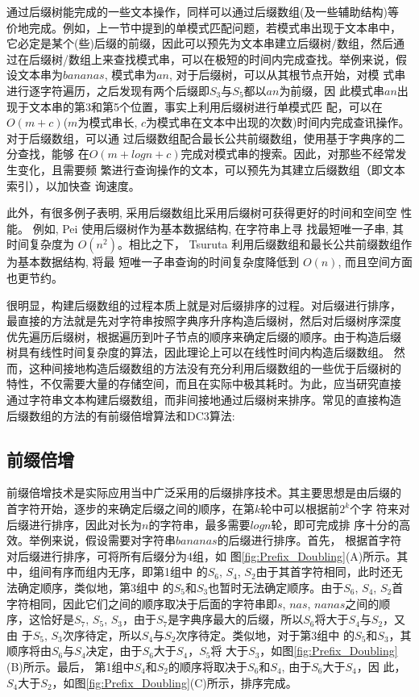 通过后缀树能完成的一些文本操作，同样可以通过后缀数组(及一些辅助结构)等
价地完成。例如，上一节中提到的单模式匹配问题，若模式串出现于文本串中，
它必定是某个(些)后缀的前缀，因此可以预先为文本串建立后缀树/数组，然后通
过在后缀树/数组上来查找模式串，可以在极短的时间内完成查找。举例来说，假
设文本串为$bananas$, 模式串为$an$, 对于后缀树，可以从其根节点开始，对模
式串进行逐字符遍历，之后发现有两个后缀即$S_3$与$S_5$都以$an$为前缀，因
此模式串$an$出现于文本串的第3和第5个位置，事实上利用后缀树进行单模式匹
配，可以在$O(m+c)$($m$为模式串长,
$c$为模式串在文本中出现的次数)时间内完成查讯操作。对于后缀数组，可以通
过后缀数组配合最长公共前缀数组，使用基于字典序的二分查找，能够
在$O(m+logn+c)$完成对模式串的搜索。因此，对那些不经常发生变化，且需要频
繁进行查询操作的文本，可以预先为其建立后缀数组（即文本索引），以加快查
询速度。

此外，有很多例子表明, 采用后缀数组比采用后缀树可获得更好的时间和空间空
性能。 例如, Pei\cite{Pei2013} 使用后缀树作为基本数据结构, 在字符串上寻
找最短唯一子串, 其时间复杂度为 $O(n^2)$。相比之下， Tsuruta
\cite{Tsuruta2014} 利用后缀数组和最长公共前缀数组作为基本数据结构, 将最
短唯一子串查询的时间复杂度降低到 $O(n)$, 而且空间方面也更节约。

很明显，构建后缀数组的过程本质上就是对后缀排序的过程。对后缀进行排序，
最直接的方法就是先对字符串按照字典序升序构造后缀树，然后对后缀树序深度
优先遍历后缀树，根据遍历到叶子节点的顺序来确定后缀的顺序。由于构造后缀
树具有线性时间复杂度的算法，因此理论上可以在线性时间内构造后缀数组。 然
而，这种间接地构造后缀数组的方法没有充分利用后缀数组的一些优于后缀树的
特性，不仅需要大量的存储空间，而且在实际中极其耗时。为此，应当研究直接
通过字符串文本构建后缀数组，而非间接地通过后缀树来排序。常见的直接构造
后缀数组的方法的有前缀倍增算法和DC3算法:

\subsection{前缀倍增}

前缀倍增技术是实际应用当中广泛采用的后缀排序技术。其主要思想是由后缀的
首字符开始，逐步的来确定后缀之间的顺序，在第$k$轮中可以根据前$2^k$个字
符来对后缀进行排序，因此对长为$n$的字符串，最多需要$logn$轮，即可完成排
序十分的高效。举例来说，假设需要对字符串$bananas$的后缀进行排序。首先，
根据首字符对后缀进行排序，可将所有后缀分为4组，如
图\ref{fig:Prefix_Doubling}(A)所示。其中，组间有序而组内无序，即第1组中
的$S_6$, $S_4$,
$S_2$由于其首字符相同，此时还无法确定顺序，类似地，第3组中
的$S_5$和$S_3$也暂时无法确定顺序。由于$S_6$, $S_4$,
$S_2$首字符相同，因此它们之间的顺序取决于后面的字符串即$s$, $nas$,
$nanas$之间的顺序，这恰好是$S_7$, $S_5$,
$S_3$，由于$S_7$是字典序最大的后缀，所以$S_6$将大于$S_4$与$S_2$，又由
于$S_5$,
$S_3$次序待定，所以$S_4$与$S_2$次序待定。类似地，对于第3组中
的$S_5$和$S_3$，其顺序将由$S_6$与$S_4$决定，由于$S_6$大于$S_4$，$S_5$将
大于$S_3$，如图\ref{fig:Prefix_Doubling}(B)所示。最后，
第1组中$S_4$和$S_2$的顺序将取决于$S_6$和$S_4$, 由于$S_6$大于$S_4$，因
此，$S_4 $大于$S_2$，如图\ref{fig:Prefix_Doubling}(C)所示，排序完成。


